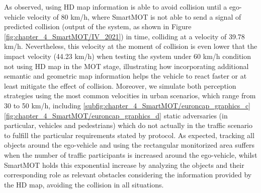 As observed, using HD map information is able to avoid collision until a ego-vehicle velocity of 80 km/h, where SmartMOT is not able to send a signal of predicted collision (output of the system, as shown in Figure \ref{fig:chapter_4_SmartMOT/IV_2021}) in time, colliding at a velocity of 39.78 km/h. Nevertheless, this velocity at the moment of collision is even lower that the impact velocity (44.23 km/h) when testing the system under 60 km/h condition not using HD map in the MOT stage, illustrating how incorporating additional semantic and geometric map information helps the vehicle to react faster or at least mitigate the effect of collision. Moreover, we simulate both perception strategies using the most common velocities in urban scenarios, which range from 30 to 50 km/h, including \ref{subfig:chapter_4_SmartMOT/euroncap_graphics_c} \ref{fig:chapter_4_SmartMOT/euroncap_graphics_d} static adversaries (in particular, vehicles and pedestrians) which do not actually in the traffic scenario to fulfill the particular requirements stated by \cite{gutierrez2021validation} protocol. As expected, tracking all objects around the ego-vehicle and using the rectangular monitorized area suffers when the number of traffic participants is increased around the ego-vehicle, whilst SmartMOT holds this exponential increase by analyzing the objects and their corresponding role as relevant obstacles considering the information provided by the HD map, avoiding the collision in all situations.

